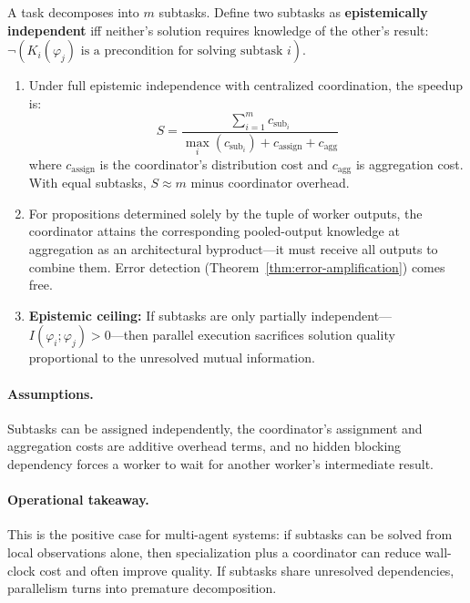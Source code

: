 \begin{theorem}
\label{thm:parallel-acceleration}
A task decomposes into $m$ subtasks. Define two subtasks as \textbf{epistemically independent} iff neither's solution requires knowledge of the other's result: $\neg(K_i(\varphi_j) \text{ is a precondition for solving subtask } i)$.
\begin{enumerate}[leftmargin=*]
\item[(a)] Under full epistemic independence with centralized coordination, the speedup is:
\begin{equation}
S = \frac{\sum_{i=1}^{m} c_{\mathrm{sub}_i}}{\max_i(c_{\mathrm{sub}_i}) + c_{\mathrm{assign}} + c_{\mathrm{agg}}}
\label{eq:parallel-speedup}
\end{equation}
where $c_{\mathrm{assign}}$ is the coordinator's distribution cost and $c_{\mathrm{agg}}$ is aggregation cost. With equal subtasks, $S \approx m$ minus coordinator overhead.
\item[(b)] For propositions determined solely by the tuple of worker outputs, the coordinator attains the corresponding pooled-output knowledge at aggregation as an architectural byproduct---it must receive all outputs to combine them. Error detection (Theorem~\ref{thm:error-amplification}) comes free.
\item[(c)] \textbf{Epistemic ceiling:} If subtasks are only partially independent---$I(\varphi_i; \varphi_j) > 0$---then parallel execution sacrifices solution quality proportional to the unresolved mutual information.
\end{enumerate}
\end{theorem}

\paragraph{Assumptions.}
Subtasks can be assigned independently, the coordinator's assignment and aggregation costs are additive overhead terms, and no hidden blocking dependency forces a worker to wait for another worker's intermediate result.

\paragraph{Operational takeaway.}
This is the positive case for multi-agent systems: if subtasks can be solved from local observations alone, then specialization plus a coordinator can reduce wall-clock cost and often improve quality. If subtasks share unresolved dependencies, parallelism turns into premature decomposition.

